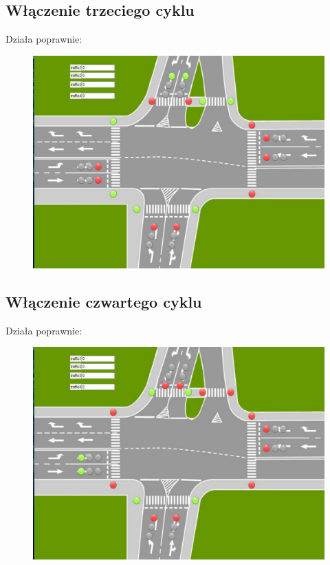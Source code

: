 \documentclass[a4paper, 12pt, titlepage]{article}
\begin{document}
		\subsection{Włączenie trzeciego cyklu}
			Działa poprawnie:
			\begin{figure}[H]
				\centering
				\includegraphics[height=0.35\textheight]{./img/trzeci.png}
			\end{figure}
		\subsection{Włączenie czwartego cyklu}
			Działa poprawnie:
			\begin{figure}[H]
				\centering
				\includegraphics[height=0.35\textheight]{./img/czwarty.png}
			\end{figure}
	\newpage
\end{document}
